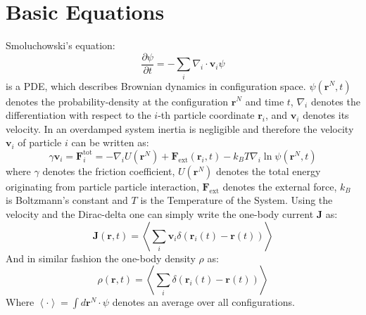\documentclass[a4paper]{article}
\renewcommand\vec[1]{\mathbf{#1}}
\begin{document}
\section{Basic Equations}
Smoluchowski's equation:
\begin{equation}\label{eq:smol}
	\frac{\partial \psi}{\partial t} = - \sum_i \nabla_i \cdot \vec{v}_i \psi
\end{equation}
is a PDE, which describes Brownian dynamics in configuration space. $\psi \left( \vec{r}^N ,t \right)$ denotes the probability-density at the configuration $\vec{r}^N$ and time $t$,	$\nabla_i$ denotes the differentiation with respect to the $i$-th particle coordinate $\vec{r}_i$, and $\vec{v}_i$ denotes its velocity. 
In an overdamped system inertia is negligible and therefore the velocity $\vec{v}_i$ of particle $i$ can be written as:
\begin{equation}\label{eq:vel}
	\gamma \vec{v}_i = \vec{F}_i^{\mathrm{tot}} = - \nabla_i U\left( \vec{r}^N \right) + \vec{F}_\mathrm{ext} \left( \vec{r}_i ,t \right) - k_B T \nabla_i \ln \psi \left( \vec{r}^N ,t \right)
\end{equation}
where $\gamma$ denotes the friction coefficient, $U\left( \vec{r}^N \right)$ denotes the total energy originating from particle particle interaction, $\vec{F}_\mathrm{ext}$ denotes the external force, $k_B$ is Boltzmann's constant and $T$ is the Temperature of the System.
Using the velocity and the Dirac-delta one can simply write the one-body current $\vec{J}$ as:
\begin{equation}
	\vec{J}\left( \vec{r}, t \right)=\left \langle \sum_i \vec{v}_i\delta\left( \vec{r}_i(t)-\vec{r}(t) \right) \right \rangle
	\label{eq:current}
\end{equation}
And in similar fashion the one-body density $\rho$ as:
\begin{equation}
	\rho\left( \vec{r}, t \right)=\left \langle \sum_i \delta\left( \vec{r}_i(t)-\vec{r}(t) \right) \right \rangle
	\label{eq:density}
\end{equation}
Where $\left\langle \cdot \right\rangle = \int d \vec{r}^N \cdot \psi $ denotes an average over all configurations.
\end{document}

